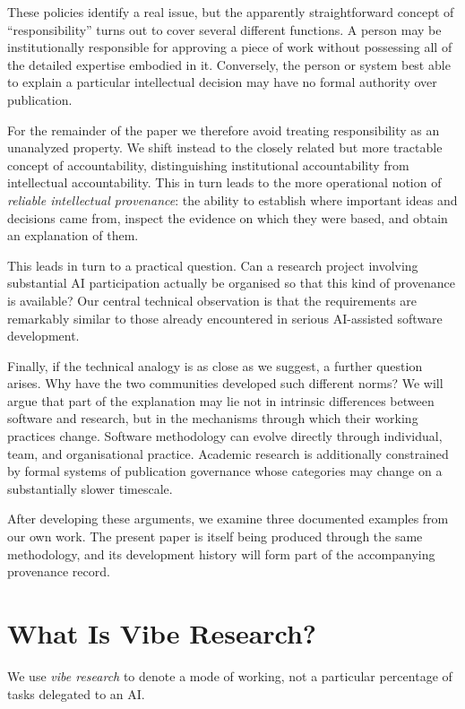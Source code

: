 These policies identify a real issue, but the apparently straightforward concept of ``responsibility'' turns out to cover several different functions. A person may be institutionally responsible for approving a piece of work without possessing all of the detailed expertise embodied in it. Conversely, the person or system best able to explain a particular intellectual decision may have no formal authority over publication.

For the remainder of the paper we therefore avoid treating responsibility as an unanalyzed property. We shift instead to the closely related but more tractable concept of accountability, distinguishing institutional accountability from intellectual accountability. This in turn leads to the more operational notion of \emph{reliable intellectual provenance}: the ability to establish where important ideas and decisions came from, inspect the evidence on which they were based, and obtain an explanation of them.

This leads in turn to a practical question. Can a research project involving substantial AI participation actually be organised so that this kind of provenance is available? Our central technical observation is that the requirements are remarkably similar to those already encountered in serious AI-assisted software development.

Finally, if the technical analogy is as close as we suggest, a further question arises. Why have the two communities developed such different norms? We will argue that part of the explanation may lie not in intrinsic differences between software and research, but in the mechanisms through which their working practices change. Software methodology can evolve directly through individual, team, and organisational practice. Academic research is additionally constrained by formal systems of publication governance whose categories may change on a substantially slower timescale.

After developing these arguments, we examine three documented examples from our own work. The present paper is itself being produced through the same methodology, and its development history will form part of the accompanying provenance record.


\section{What Is Vibe Research?}

We use \emph{vibe research} to denote a mode of working, not a particular percentage of tasks delegated to an AI.

